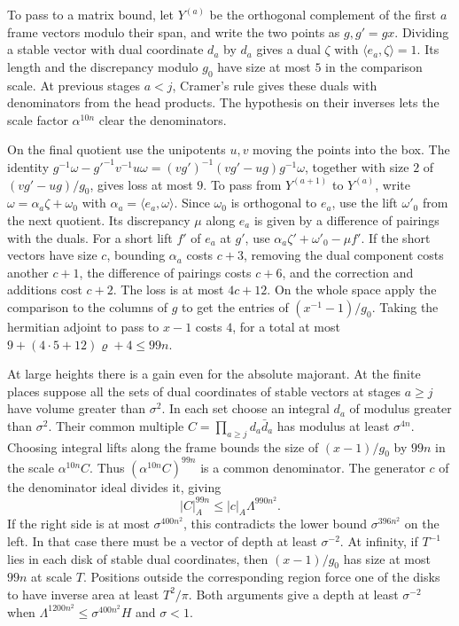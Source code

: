 To pass to a matrix bound, let \(Y^{(a)}\) be the orthogonal
complement of the first \(a\) frame vectors modulo their span,
and write the two points as \(g,g'=gx\).
Dividing a stable vector with dual coordinate \(d_a\) by \(d_a\)
gives a dual \(\zeta\) with \(\langle e_a,\zeta\rangle=1\).
Its length and the discrepancy modulo \(g_0\) have size at most
\(5\) in the comparison scale. At previous stages \(a<j\),
Cramer's rule gives these duals with denominators from the head
products. The hypothesis on their inverses lets the scale factor
\(\alpha^{10n}\) clear the denominators.

On the final quotient use the unipotents \(u,v\) moving the points
into the box. The identity
\(g^{-1}\omega-g'^{-1}v^{-1}u\omega
=(vg')^{-1}(vg'-ug)g^{-1}\omega\), together with size \(2\) of
\((vg'-ug)/g_0\), gives loss at most \(9\).
To pass from \(Y^{(a+1)}\) to \(Y^{(a)}\), write
\(\omega=\alpha_a\zeta+\omega_0\) with
\(\alpha_a=\langle e_a,\omega\rangle\). Since \(\omega_0\) is
orthogonal to \(e_a\), use the lift \(\omega'_0\) from the next
quotient. Its discrepancy \(\mu\) along \(e_a\) is given by a
difference of pairings with the duals. For a short lift \(f'\) of
\(e_a\) at \(g'\), use \(\alpha_a\zeta'+\omega'_0-\mu f'\).
If the short vectors have size \(c\), bounding \(\alpha_a\) costs
\(c+3\), removing the dual component costs another \(c+1\),
the difference of pairings costs \(c+6\), and the correction
and additions cost \(c+2\). The loss is at most \(4c+12\).
On the whole space apply the comparison to the columns of \(g\)
to get the entries of \((x^{-1}-1)/g_0\). Taking the hermitian
adjoint to pass to \(x-1\) costs \(4\), for a total at most
\(9+(4\cdot5+12)\varrho+4\le99n\).

At large heights there is a gain even for the absolute majorant.
At the finite places suppose all the sets of dual coordinates of
stable vectors at stages \(a\ge j\) have volume greater than
\(\sigma^2\). In each set choose an integral \(d_a\) of modulus
greater than \(\sigma^2\). Their common multiple
\(C=\prod_{a\ge j}d_a\bar d_a\) has modulus at least \(\sigma^{4n}\).
Choosing integral lifts along the frame bounds the size of
\((x-1)/g_0\) by \(99n\) in the scale \(\alpha^{10n}C\).
Thus \((\alpha^{10n}C)^{99n}\) is a common denominator. The generator \(c\)
of the denominator ideal divides it, giving
\[
 |C|_A^{99n}\le |c|_A\Lambda^{990n^2}.
\]
If the right side is at most \(\sigma^{400n^2}\), this contradicts the
lower bound \(\sigma^{396n^2}\) on the left. In that case there must be
a vector of depth at least \(\sigma^{-2}\).
At infinity, if \(T^{-1}\) lies in each disk of stable dual coordinates,
then \((x-1)/g_0\) has size at most \(99n\) at scale \(T\).
Positions outside the corresponding region force one of the disks
to have inverse area at least \(T^2/\pi\).
Both arguments give a depth at least \(\sigma^{-2}\) when
\(\Lambda^{1200n^2}\le \sigma^{400n^2}H\) and \(\sigma<1\).

